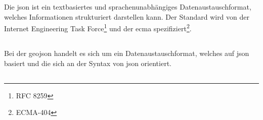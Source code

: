 \chapter{
}

\section{
}
Die \ac{json} ist ein textbasiertes und sprachenunabhängiges Datenaustauschformat, welches Informationen strukturiert darstellen kann. Der Standard wird von der Internet Engineering Task Force\footnote{RFC 8259} und der \ac{ecma} spezifiziert\footnote{ECMA-404}.

\section{
}
Bei der \ac{geojson} handelt es sich um ein Datenaustauschformat, welches auf \ac{json} basiert und die sich an der Syntax von \ac{json} orientiert.

\section{
}
